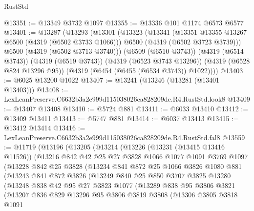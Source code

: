 \begin{lexlean}{RustStd}
\begin{coremodule}
@13351 := @13349 @3732 @1097
@13355 := @13336 @101 @1174 @6573 @6577
@13401 := @13287
    (@13293
      (@13301
        (@13323
          (@13341
            (@13351 @13355 @13267 @6500 (@4319 (@6502 @3733 @1066)))
            @6500
            (@4319 (@6502 @3723 @3739)))
          @6500
          (@4319 (@6502 @3713 @3740)))
        (@6509 (@6510 @3743))
        (@4319 (@6514 @3743))
        (@4319 (@6519 @3743))
        (@4319 (@6523 @3743 @13296))
        (@4319 (@6528 @824 @13296 @95))
        (@4319 (@6454 (@6455 (@6534 @3743)) @1022))))
@13403 := @6025 @13200 @1022
@13407 := @13241 (@13246 (@13281 (@13401 @13403)))
@13408 := LexLeanPreserve.C6632b3a2e999d115038026ca828209de.R4.RustStd.look8
@13409 := @13407 @13408
@13410 := @5724 @881
@13411 := @6033 @13410
@13412 := @13409 @13411
@13413 := @5747 @881
@13414 := @6037 @13413
@13415 := @13412 @13414
@13416 := LexLeanPreserve.C6632b3a2e999d115038026ca828209de.R4.RustStd.fal8
@13559 := @11719
    (@13196
      (@13205
        (@13214
          (@13226
            (@13231 (@13415 @13416 @11526))
            (@13216
              @842
              @42
              @25
              @27
              @3828
              @1066
              @1077
              @1091
              @3769
              @1097
              (@13228
                @842
                @25
                @3828
                (@13234
                  @841
                  @872
                  @25
                  @1066
                  @3826
                  @1080
                  @881
                  (@13243
                    @841
                    @872
                    @3826
                    (@13249
                      @840
                      @25
                      @850
                      @3707
                      @3825
                      @13280
                      (@13248
                        @838
                        @42
                        @95
                        @27
                        @3823
                        @1077
                        (@13289
                          @838
                          @95
                          @3806
                          @3821
                          (@13207
                            @836
                            @829
                            @13296
                            @95
                            @3806
                            @3819
                            @3808
                            (@13306
                              @3805
                              @3818
                              @1091

\end{coremodule}
\end{lexlean}
